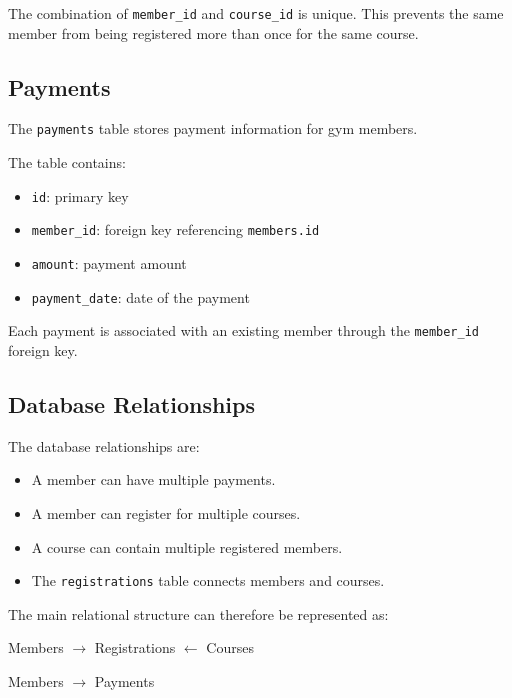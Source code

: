 \documentclass[12pt,a4paper]{article}
\begin{document}
The combination of \texttt{member\_id} and
\texttt{course\_id} is unique. This prevents the same member
from being registered more than once for the same course.


\subsection{Payments}

The \texttt{payments} table stores payment information for
gym members.

The table contains:

\begin{itemize}
    \item \texttt{id}: primary key
    \item \texttt{member\_id}: foreign key referencing
    \texttt{members.id}
    \item \texttt{amount}: payment amount
    \item \texttt{payment\_date}: date of the payment
\end{itemize}

Each payment is associated with an existing member through
the \texttt{member\_id} foreign key.


\subsection{Database Relationships}

The database relationships are:

\begin{itemize}
    \item A member can have multiple payments.
    \item A member can register for multiple courses.
    \item A course can contain multiple registered members.
    \item The \texttt{registrations} table connects members
    and courses.
\end{itemize}

The main relational structure can therefore be represented
as:

\begin{center}
Members $\longrightarrow$ Registrations $\longleftarrow$ Courses
\end{center}

\begin{center}
Members $\longrightarrow$ Payments
\end{center}
   
\end{document}
